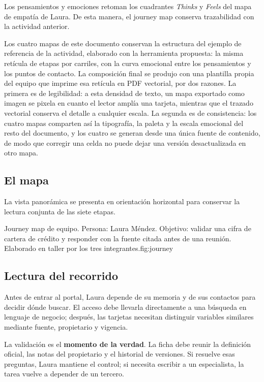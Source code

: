 Los pensamientos y emociones retoman los cuadrantes \emph{Thinks} y \emph{Feels} del mapa de
empatía de Laura. De esta manera, el journey map conserva trazabilidad con la actividad
anterior.

\begin{uxnota}
Los cuatro mapas de este documento conservan la estructura del ejemplo de referencia de la
actividad, elaborado con la herramienta propuesta: la misma retícula de etapas por carriles,
con la curva emocional entre los pensamientos y los puntos de contacto. La composición final
se produjo con una plantilla propia del equipo que imprime esa retícula en PDF vectorial, por
dos razones. La primera es de legibilidad: a esta densidad de texto, un mapa exportado como
imagen se pixela en cuanto el lector amplía una tarjeta, mientras que el trazado vectorial
conserva el detalle a cualquier escala. La segunda es de consistencia: los cuatro mapas
comparten así la tipografía, la paleta y la escala emocional del resto del documento, y los
cuatro se generan desde una única fuente de contenido, de modo que corregir una celda no
puede dejar una versión desactualizada en otro mapa.
\end{uxnota}

\subsection{El mapa}

La vista panorámica se presenta en orientación horizontal para conservar la lectura conjunta
de las siete etapas.

  {Journey map de equipo. Persona: Laura Méndez. Objetivo: validar una cifra de cartera de
   crédito y responder con la fuente citada antes de una reunión. Elaborado en taller por los
   tres integrantes.}{fig:journey}

\subsection{Lectura del recorrido}\label{sec:recorrido}

Antes de entrar al portal, Laura depende de su memoria y de sus contactos para decidir dónde
buscar. El acceso debe llevarla directamente a una búsqueda en lenguaje de negocio; después,
las tarjetas necesitan distinguir variables similares mediante fuente, propietario y vigencia.

La validación es el \textbf{momento de la verdad}. La ficha debe reunir la definición oficial,
las notas del propietario y el historial de versiones. Si resuelve esas preguntas, Laura
mantiene el control; si necesita escribir a un especialista, la tarea vuelve a depender de un
tercero.

